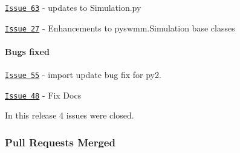 \begin{DoxyItemize}
\item \href{https://github.com/OpenWaterAnalytics/pyswmm/issues/63}{\tt Issue 63} -\/ updates to Simulation.\+py
\item \href{https://github.com/OpenWaterAnalytics/pyswmm/issues/27}{\tt Issue 27} -\/ Enhancements to pyswmm.\+Simulation base classes
\end{DoxyItemize}

\paragraph*{Bugs fixed}


\begin{DoxyItemize}
\item \href{https://github.com/OpenWaterAnalytics/pyswmm/issues/55}{\tt Issue 55} -\/ import update bug fix for py2.
\item \href{https://github.com/OpenWaterAnalytics/pyswmm/issues/48}{\tt Issue 48} -\/ Fix Docs
\end{DoxyItemize}

In this release 4 issues were closed.

\subsubsection*{Pull Requests Merged}


